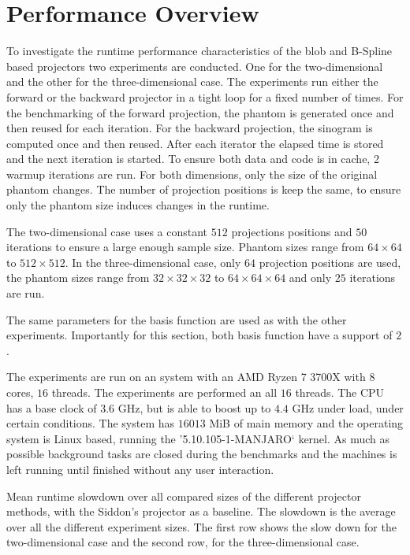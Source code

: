 \section{Performance Overview}\label{sec:experiments_performance_projection}

To investigate the runtime performance characteristics of the blob and B-Spline based projectors two
experiments are conducted. One for the two-dimensional and the other for the three-dimensional case.
The experiments run either the forward or the backward projector in a tight loop for a fixed number
of times. For the benchmarking of the forward projection, the phantom is generated once and then
reused for each iteration. For the backward projection, the sinogram is computed once and then
reused. After each iterator the elapsed time is stored and the next iteration is started. To ensure
both data and code is in cache, 2 warmup iterations are run. For both dimensions, only the size of
the original phantom changes. The number of projection positions is keep the same, to ensure only
the phantom size induces changes in the runtime.

The two-dimensional case uses a constant \(512\) projections positions and \(50\) iterations to
ensure a large enough sample size. Phantom sizes range from \(64 \times 64\) to \(512 \times 512\).
In the three-dimensional case, only \(64\) projection positions are used, the phantom sizes range
from \(32 \times 32 \times 32\) to \(64 \times 64 \times 64\) and only \(25\) iterations are run.

The same parameters for the basis function are used as with the other experiments. Importantly for
this section, both basis function have a support of \(2\).

The experiments are run on an system with an AMD Ryzen 7 3700X with \(8\) cores, \(16\) threads. The
experiments are performed an all \(16\) threads. The CPU has a base clock of \(3.6\) GHz, but is
able to boost up to \(4.4\) GHz under load, under certain conditions. The system has \(16013\) MiB
of main memory and the operating system is Linux based, running the '5.10.105-1-MANJARO` kernel. As
much as possible background tasks are closed during the benchmarks and the machines is left running
until finished without any user interaction.

\begin{table}[h]%
	\centering
	\caption{Mean runtime slowdown over all compared sizes of the different projector methods,
		with the Siddon's projector as a baseline. The slowdown is the average over all the
		different experiment sizes. The first row shows the slow down for the
		two-dimensional case and the second row, for the three-dimensional case.}%
	\label{tab:runtime_slowdown}
\end{table}

